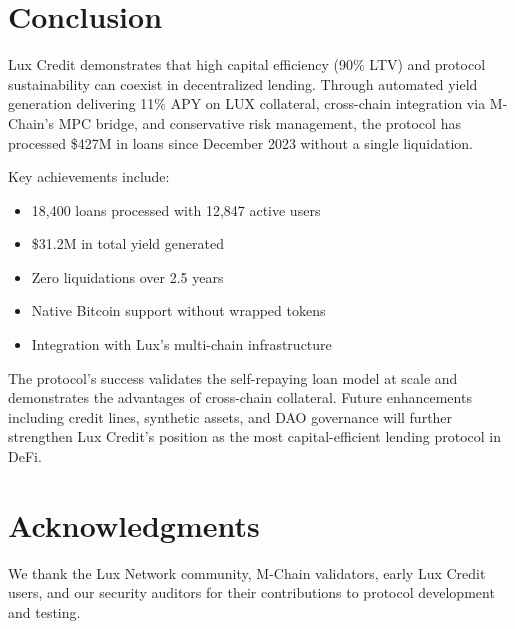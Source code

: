 \documentclass[11pt,a4paper]{article}
\begin{document}
\section{Conclusion}

Lux Credit demonstrates that high capital efficiency (90\% LTV) and protocol sustainability can coexist in decentralized lending. Through automated yield generation delivering 11\% APY on LUX collateral, cross-chain integration via M-Chain's MPC bridge, and conservative risk management, the protocol has processed \$427M in loans since December 2023 without a single liquidation.

Key achievements include:
\begin{itemize}
\item 18,400 loans processed with 12,847 active users
\item \$31.2M in total yield generated
\item Zero liquidations over 2.5 years
\item Native Bitcoin support without wrapped tokens
\item Integration with Lux's multi-chain infrastructure
\end{itemize}

The protocol's success validates the self-repaying loan model at scale and demonstrates the advantages of cross-chain collateral. Future enhancements including credit lines, synthetic assets, and DAO governance will further strengthen Lux Credit's position as the most capital-efficient lending protocol in DeFi.

\section*{Acknowledgments}

We thank the Lux Network community, M-Chain validators, early Lux Credit users, and our security auditors for their contributions to protocol development and testing.
\end{document}
